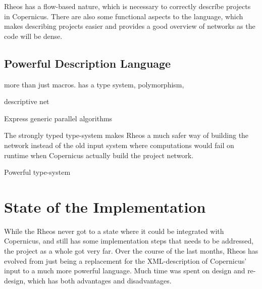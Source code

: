 Rheos has a flow-based nature, which is necessary to correctly
descríbe projects in Copernicus. There are also some functional
aspects to the language, which makes describing projects easier and
provides a good overview of networks as the code will be dense.


\subsection{Powerful Description Language}

more than just macros. has a type system, polymorphism, 

descriptive net

Express generic parallel algorithms

The strongly typed type-system makes Rheos a much safer way of
building the network instead of the old input system where
computations would fail on runtime when Copernicus actually build the
project network.

Powerful type-system


\section{State of the Implementation}
While the Rheos never got to a state where it could be integrated with
Copernicus, and still has some implementation steps that needs to be
addressed, the project as a whole got very far. Over the course of the
last months, Rheos has evolved from just being a replacement for the
XML-description of Copernicus' input to a much more powerful
language. Much time was spent on design and re-design, which has both
advantages and disadvantages.
